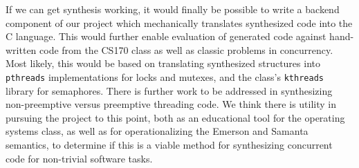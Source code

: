 If we can get synthesis working, it would finally be possible to write a backend component of our project which mechanically translates synthesized code into the C language.  This would further enable evaluation of generated code against hand-written code from the CS170 class as well as classic problems in concurrency.  Most likely, this would be based on translating synthesized structures into \texttt{pthreads} implementations for locks and mutexes, and the class's \texttt{kthreads} library for semaphores.  There is further work to be addressed in synthesizing non-preemptive versus preemptive threading code.  We think there is utility in pursuing the project to this point, both as an educational tool for the operating systems class, as well as for operationalizing the Emerson and Samanta semantics, to determine if this is a viable method for synthesizing concurrent code for non-trivial software tasks.

